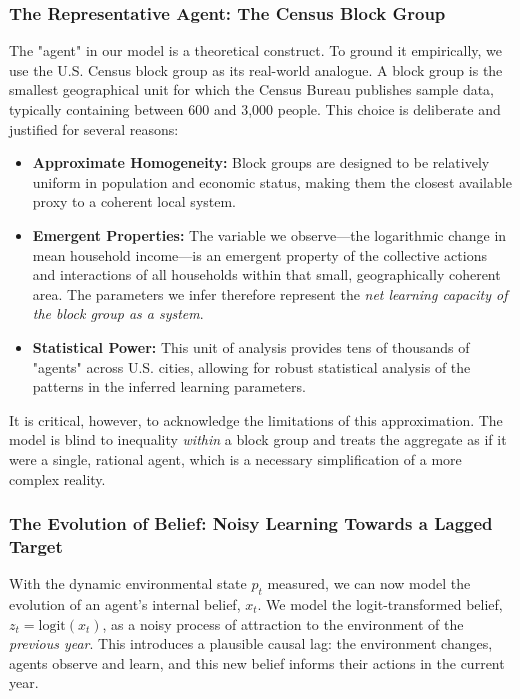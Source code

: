 \documentclass{article}
\begin{document}
\subsubsection{The Representative Agent: The Census Block Group}
The "agent" in our model is a theoretical construct. To ground it empirically, we use the U.S. Census block group as its real-world analogue. A block group is the smallest geographical unit for which the Census Bureau publishes sample data, typically containing between 600 and 3,000 people. This choice is deliberate and justified for several reasons:
\begin{itemize}
    \item \textbf{Approximate Homogeneity:} Block groups are designed to be relatively uniform in population and economic status, making them the closest available proxy to a coherent local system.
    \item \textbf{Emergent Properties:} The variable we observe—the logarithmic change in mean household income—is an emergent property of the collective actions and interactions of all households within that small, geographically coherent area. The parameters we infer therefore represent the \textit{net learning capacity of the block group as a system}.
    \item \textbf{Statistical Power:} This unit of analysis provides tens of thousands of "agents" across U.S. cities, allowing for robust statistical analysis of the patterns in the inferred learning parameters.
\end{itemize}
It is critical, however, to acknowledge the limitations of this approximation. The model is blind to inequality \textit{within} a block group and treats the aggregate as if it were a single, rational agent, which is a necessary simplification of a more complex reality.

\subsubsection{The Evolution of Belief: Noisy Learning Towards a Lagged Target}
With the dynamic environmental state \(p_t\) measured, we can now model the evolution of an agent's internal belief, \(x_t\). We model the logit-transformed belief, \(z_t = \text{logit}(x_t)\), as a noisy process of attraction to the environment of the \textit{previous year}. This introduces a plausible causal lag: the environment changes, agents observe and learn, and this new belief informs their actions in the current year.
\end{document}
